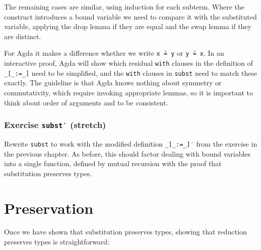 The remaining cases are similar, using induction for each subterm. Where
the construct introduces a bound variable we need to compare it with the
substituted variable, applying the drop lemma if they are equal and the
swap lemma if they are distinct.

For Agda it makes a difference whether we write \texttt{x\ ≟\ y} or
\texttt{y\ ≟\ x}. In an interactive proof, Agda will show which residual
\texttt{with} clauses in the definition of \texttt{\_{[}\_:=\_{]}} need
to be simplified, and the \texttt{with} clauses in \texttt{subst} need
to match these exactly. The guideline is that Agda knows nothing about
symmetry or commutativity, which require invoking appropriate lemmas, so
it is important to think about order of arguments and to be consistent.

\hypertarget{exercise-subst-stretch}{%
\subsubsection{\texorpdfstring{Exercise \texttt{subst′}
(stretch)}{Exercise subst′ (stretch)}}\label{exercise-subst-stretch}}

Rewrite \texttt{subst} to work with the modified definition
\texttt{\_{[}\_:=\_{]}′} from the exercise in the previous chapter. As
before, this should factor dealing with bound variables into a single
function, defined by mutual recursion with the proof that substitution
preserves types.

\begin{fence}
\begin{code}%
\>[0]\<%
\end{code}
\end{fence}

\hypertarget{preservation}{%
\section{Preservation}\label{preservation}}

Once we have shown that substitution preserves types, showing that
reduction preserves types is straightforward:

